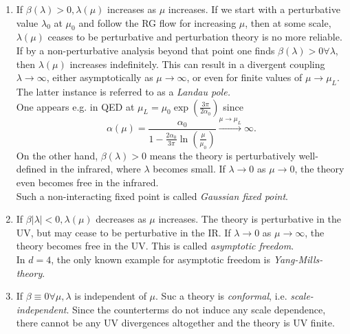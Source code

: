 \begin{enumerate}
	\item If $\beta(\lambda) >0,  \lambda(\mu)$ increases as $\mu$ increases. If we start with a perturbative value $\lambda_0$ at $\mu_0$ and follow the RG flow for increasing $\mu$, then at some scale, $\lambda(\mu)$ ceases to be perturbative and perturbation theory is no more reliable. If by a non-perturbative analysis beyond that point one finds $\beta(\lambda) >0 \forall \lambda$, then $\lambda(\mu)$ increases indefinitely. This can result in a divergent coupling $\lambda \rightarrow \infty$, either asymptotically as $\mu \rightarrow\infty$, or even for finite values of $\mu \rightarrow \mu_L$. The latter instance is referred to as a \emph{Landau pole.}\\
	One appears e.g. in QED at $\mu_L= \mu_0 \exp\left(\frac{3 \pi}{2 \alpha_0}\right)$ since
	\begin{equation}
		\alpha(\mu) = \frac{\alpha_0}{1-\frac{2\alpha_0}{3\pi} \ln(\frac{\mu}{\mu_0})} \stackrel{\mu \rightarrow \mu_L}{\rightarrow} \infty.
	\end{equation}
	On the other hand, $\beta(\lambda) >0$ means the theory is perturbatively well-defined in the infrared, where $\lambda$ becomes small. If $\lambda \rightarrow 0$ as $\mu \rightarrow 0$, the theory even becomes free in the infrared.\\
	Such a non-interacting fixed point is called \emph{Gaussian fixed point}.
	\item If $\beta |\lambda| < 0, \lambda(\mu)$ decreases as $ \mu$ increases. The theory is perturbative in the UV, but may cease to be perturbative in the IR. If $\lambda \rightarrow 0$ as $\mu \rightarrow \infty$, the theory becomes free in the UV. This is called \emph{asymptotic freedom}.\\
	In $d=4$, the only known example for asymptotic freedom is \emph{Yang-Mills-theory}.
	\item If $\beta \equiv 0 \forall \mu, \lambda$ is independent of $\mu$. Suc a theory is \emph{conformal}, i.e. \emph{scale-independent}. Since the counterterms do not induce any scale dependence, there cannot be any UV divergences altogether and the theory is UV finite.
\end{enumerate}

